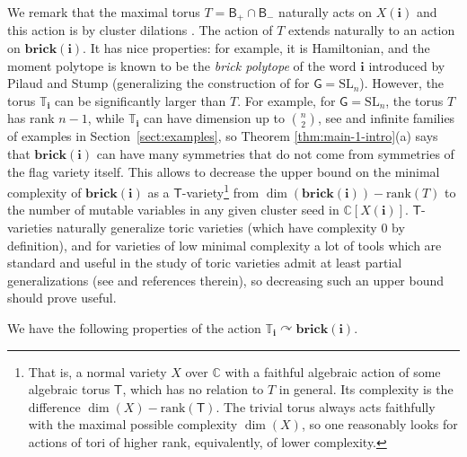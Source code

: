 \documentclass[a4paper, 11pt]{amsart}
\newcommand{\brick}{\mathbf{brick}}
\newcommand{\SL}{\mathrm{SL}}
\newcommand{\borel}{\mathsf{B}}
\newcommand{\word}[1]{\mathbf{#1}}
\newcommand{\group}{\mathsf{G}}
\newcommand{\rank}{\mathrm{rank}}
\newcommand{\dil}[1]{\mathbb{T}_{#1}}
\theoremstyle{definition}
\def\CC{\mathbb{C}}
\begin{document}
We remark that the maximal torus $T = \borel_{+}\cap \borel_{-}$ naturally acts on $X(\word{i})$ and this action is by cluster dilations \cite[Corollary 4.26]{CGSS}. The action of $T$ extends naturally to an action on $\brick(\word{i})$. It has nice properties: for example, it is Hamiltonian, and the moment polytope is known \cite{escobar} to be the \emph{brick polytope} of the word $\word{i}$ introduced by Pilaud and Stump \cite{pilaud_stump_15} (generalizing the construction of \cite{pilaud_santos_12} for $\group = \SL_n$). However, the torus $\dil{\word{i}}$ can be significantly larger than $T$. For example, for $\group = \SL_n$, the torus $T$ has rank $n-1$, while $\dil{\word{i}}$ can have dimension up to $\binom{n}{2}$, see \cite[Proposition 6.3]{CGGLSS} and infinite families of examples in Section~\ref{sect:examples}, so Theorem \ref{thm:main-1-intro}(a) says that $\brick(\word{i})$ can have many symmetries that do not come from symmetries of the flag variety itself. This allows to decrease the upper bound on the minimal complexity of $\brick(\word{i})$ as a $\mathsf{T}$-variety\footnote{That is, a normal variety $X$ over $\CC$ with a faithful algebraic action of some algebraic torus $\mathsf{T}$, which has no relation to $T$ in general. Its complexity is the difference $\dim(X) - \rank(\mathsf{T})$. The trivial torus always acts faithfully with the maximal possible complexity $\dim(X)$, so one reasonably looks for actions of tori of higher rank, equivalently, of lower complexity.} from $\dim(\brick(\word{i})) - \rank (T)$ to the number of mutable variables in any given cluster seed in $\CC[X(\word{i})]$. $\mathsf{T}$-varieties naturally generalize toric varieties (which have complexity $0$ by definition), and for varieties of low minimal complexity a lot of tools which are standard and useful in the study of toric varieties admit at least partial generalizations (see \cite{T_varieties} and references therein), so decreasing such an upper bound should prove useful.

We have the following properties of the action $\dil{\word{i}} \curvearrowright \brick(\word{i})$.
\end{document}
